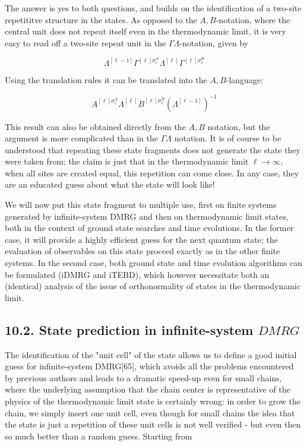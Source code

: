 \documentclass[12pt]{article}
\begin{document}
The answer is yes to both questions, and builds on the identification of a two-site repetititve structure in the states. As opposed to the $A, B$-notation, where the central unit does not repeat itself even in the thermodynamic limit, it is very easy to read off a two-site repeat unit in the $\Gamma \Lambda$-notation, given by


\begin{equation*}
\Lambda^{[\ell-1]} \Gamma^{[\ell] \sigma_{\ell}^{A}} \Lambda^{[\ell]} \Gamma^{[\ell] \sigma_{\ell}^{B}} \tag{333}
\end{equation*}


Using the translation rules it can be translated into the $A, B$-language:


\begin{equation*}
A^{[\ell] \sigma_{\ell}^{A}} \Lambda^{[\ell]} B^{[\ell] \sigma_{\ell}^{B}}\left(\Lambda^{[\ell-1]}\right)^{-1} \tag{334}
\end{equation*}


This result can also be obtained directly from the $A, B$ notation, but the argument is more complicated than in the $\Gamma \Lambda$ notation. It is of course to be understood that repeating these state fragments does not generate the state they were taken from; the claim is just that in the thermodynamic limit $\ell \rightarrow \infty$, when all sites are created equal, this repetition can come close. In any case, they are an educated guess about what the state will look like!

We will now put this state fragment to multiple use, first on finite systems generated by infinite-system DMRG and then on thermodynamic limit states, both in the context of ground state searches and time evolutions. In the former case, it will provide a highly efficient guess for the next quantum state; the evaluation of observables on this state proceed exactly as in the other finite systems. In the second case, both ground state and time evolution algorithms can be formulated (iDMRG and iTEBD), which however necessitate both an (identical) analysis of the issue of orthonormality of states in the thermodynamic limit.

\subsection*{10.2. State prediction in infinite-system $D M R G$}
The identification of the "unit cell" of the state allows us to define a good initial guess for infinite-system DMRG[65], which avoids all the problems encountered by previous authors and leads to a dramatic speed-up even for small chains, where the underlying assumption that the chain center is representative of the physics of the thermodynamic limit state is certainly wrong: in order to grow the chain, we simply insert one unit cell, even though for small chains the idea that the state is just a repetition of these unit cells is not well verified - but even then so much better than a random guess. Starting from
\end{document}
